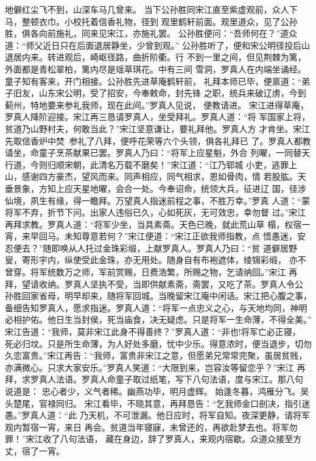 地僻红尘飞不到，山深车马几曾来。
当下公孙胜同宋江直至紫虚观前，众人下马，整顿衣巾。小校托着信香礼物，径到
观里鹤轩前面。观里道众，见了公孙胜，俱各向前施礼，同来见宋江，亦施礼罢。
公孙胜便问：“吾师何在？”道众道：“师父近日只在后面退居静坐，少曾到观。”
公孙胜听了，便和宋公明径投后山退居内来。转进观后，崎岖径路，曲折阶衢。行
不到一里之间，但见荆棘为篱，外面都是青松翠柏，篱内尽是瑶草琪花。中有三间
雪洞，罗真人在内端坐诵经。童子知有客来，开门相接。公孙胜先进草庵鹤轩前，
礼拜本师已毕，便禀道：“弟子旧友，山东宋公明，受了招安，今奉敕命，封先锋
之职，统兵来破辽虏，今到蓟州，特地要来参礼我师，现在此间。”罗真人见说，
便教请进。
宋江进得草庵，罗真人降阶迎接。宋江再三恳请罗真人，坐受拜礼。罗真人道：“将
军国家上将，贫道乃山野村夫，何敢当此？”宋江坚意谦让，要礼拜他。罗真人方
才肯坐。宋江先取信香炉中焚，参礼了八拜，便呼花荣等六个头领，俱各礼拜已
了。罗真人都教请坐，命童子烹茶献果已罢。罗真人乃曰：“将军上应星魁，外合
列曜，一同替天行道，今则归顺宋朝，此清名万载不磨矣！”宋江道：“江乃郓城
小吏，逃罪上山，感谢四方豪杰，望风而来。同声相应，同气相求，恩如骨肉，情
若股肱。天垂景象，方知上应天星地曜，会合一处。今奉诏命，统领大兵，征进辽
国，径涉仙境，夙生有缘，得一瞻拜。万望真人指迷前程之事，不胜万幸。”罗真
人道：“蒙将军不弃，折节下问。出家人违俗已久，心如死灰，无可效忠，幸勿督
过。”宋江再拜求教。罗真人道：“将军少坐，当具素斋。天色已晚，就此荒山草
榻，权宿一宵，来早回马。未知尊意若何？”宋江便道：“宋江正欲我师指教，点
悟愚迷，安忍便去？”随即唤从人托过金珠彩缎，上献罗真人。罗真人乃曰：“贫
道僻居野叟，寄形宇内，纵使受此金珠，亦无用处。随身自有布袍遮体，绫锦彩缎，
亦不曾穿。将军统数万之师，军前赏赐，日费浩繁，所赐之物，乞请纳回。”宋江
再拜，望请收纳。罗真人坚执不受，当即供献素斋，斋罢，又吃了茶。罗真人令公
孙胜回家省母，明早却来，随将军回城。当晚留宋江庵中闲话。宋江把心腹之事，
备细告知罗真人，愿求指迷。罗真人道：“将军一点忠义之心，与天地均同，神明
必相护佑。他日生当封侯，死当庙食，决无疑虑。只是将军一生命薄，不得全美。”
宋江告道：“我师，莫非宋江此身不得善终？”罗真人道：“非也!将军亡必正寝，
死必归坟。只是所生命薄，为人好处多磨，忧中少乐。得意浓时，便当退步，切勿
久恋富贵。”宋江再告：“我师，富贵非宋江之意，但愿弟兄常常完聚，虽居贫贱，
亦满微心。只求大家安乐。”罗真人笑道：“大限到来，岂容汝等留恋乎？”宋江
再拜，求罗真人法语。罗真人命童子取过纸笔，写下八句法语，度与宋江。那八句
说道是：
忠心者少，义气者稀。幽燕功毕，明月虚辉。
始逢冬暮，鸿雁分飞。吴头楚尾，官禄同归。
宋江看毕，不晓其意，再拜恳告：“乞我师金口剖决，指引迷愚。”罗真人道：“此
乃天机，不可泄漏。他日应时，将军自知。夜深更静，请将军观内暂宿一宵，来日
再会。贫道当年寝寐，未曾还的，再欲赴梦去也。将军勿罪！”宋江收了八句法语，
藏在身边，辞了罗真人，来观内宿歇。众道众接至方丈，宿了一宵。
